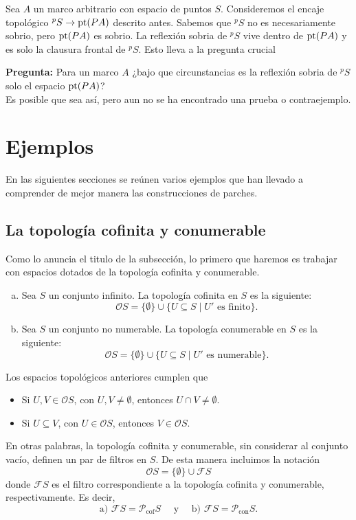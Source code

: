 Sea $A$ un marco arbitrario con espacio de puntos $S$. Consideremos el encaje topológico $^pS\to \mathrm{pt}(PA)$ descrito antes. Sabemos que $^pS$ no es necesariamente sobrio, pero $\mathrm{pt}(PA)$ es sobrio. La reflexión sobria de $^pS$ vive dentro de $\mathrm{pt}(PA)$ y es solo la clausura frontal de $^pS$. Esto lleva a la pregunta crucial

\textbf{Pregunta:} Para un marco $A$ ¿bajo que circunstancias es la reflexión sobria de $^pS$ solo el espacio $\mathrm{pt}(PA)$?\\

Es posible que sea así, pero aun no se ha encontrado una prueba o contraejemplo.

\section{Ejemplos}\label{Ejemplos Rosy}

En las siguientes secciones se reúnen varios ejemplos que han llevado a comprender de mejor manera las construcciones de parches. 

\subsection{La topología cofinita y conumerable}

Como lo anuncia el titulo de la subsección, lo primero que haremos es trabajar con espacios dotados de la topología cofinita y conumerable.

\begin{dfn}\label{Coficonu}
    \begin{enumerate}[a)]
        \item Sea $S$ un conjunto infinito. La topología cofinita en $S$ es la siguiente:
        \[
        \mathcal{O}S=\{\emptyset\}\cup\{U\subseteq S\mid U' \mbox{ es finito}\}.
        \]
        \item Sea $S$ un conjunto no numerable. La topología conumerable en $S$ es la siguiente:
        \[
        \mathcal{O}S=\{\emptyset\}\cup\{U\subseteq S\mid U' \mbox{ es numerable}\}.
        \]
    \end{enumerate}
\end{dfn}

Los espacios topológicos anteriores cumplen que
\begin{itemize}
    \item Si $U, V\in \mathcal{O}S$, con $U, V\neq \emptyset$, entonces $U\cap V\neq \emptyset$.
    \item Si $U\subseteq V$, con $U\in \mathcal{O}S$, entonces $V\in \mathcal{O}S$.
\end{itemize}
En otras palabras, la topología cofinita y conumerable, sin considerar al conjunto vacío, definen un par de filtros en $S$. De esta manera incluimos la notación
\[
\mathcal{O}S=\{\emptyset\}\cup \mathcal{F}S
\]
donde $\mathcal{F}S$ es el filtro correspondiente a la topología cofinita y conumerable, respectivamente. Es decir,
\[
\mbox{a) }\mathcal{F}S=\mathcal{P}_{\mbox{cof}}S\quad\mbox{ y }\quad\mbox{b) }\mathcal{F}S=\mathcal{P}_{\mbox{con}}S.
\]

